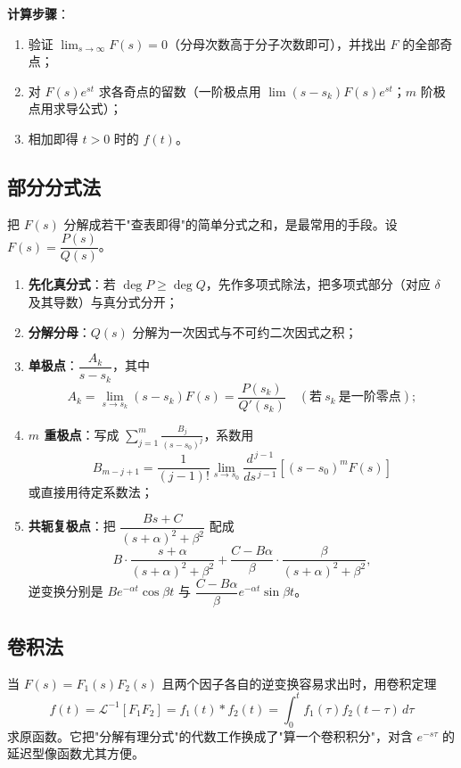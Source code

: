 \textbf{计算步骤}：
\begin{enumerate}
    \item 验证 \(\lim_{s\to\infty}F(s)=0\)（分母次数高于分子次数即可），并找出 \(F\) 的全部奇点；
    \item 对 \(F(s)e^{st}\) 求各奇点的留数（一阶极点用 \(\lim(s-s_k)F(s)e^{st}\)；\(m\) 阶极点用求导公式）；
    \item 相加即得 \(t>0\) 时的 \(f(t)\)。
\end{enumerate}

\subsection{部分分式法}

把 \(F(s)\) 分解成若干"查表即得"的简单分式之和，是最常用的手段。设 \(F(s)=\dfrac{P(s)}{Q(s)}\)。

\begin{enumerate}
    \item \textbf{先化真分式}：若 \(\deg P\ge\deg Q\)，先作多项式除法，把多项式部分（对应 \(\delta\) 及其导数）与真分式分开；
    \item \textbf{分解分母}：\(Q(s)\) 分解为一次因式与不可约二次因式之积；
    \item \textbf{单极点}：\(\dfrac{A_k}{s-s_k}\)，其中
    \[
    A_k=\lim_{s\to s_k}(s-s_k)F(s)=\frac{P(s_k)}{Q'(s_k)}\quad(\text{若}\ s_k\ \text{是一阶零点});
    \]
    \item \textbf{\(m\) 重极点}：写成 \(\displaystyle\sum_{j=1}^{m}\frac{B_j}{(s-s_0)^j}\)，系数用
    \[
    B_{m-j+1}=\frac{1}{(j-1)!}\lim_{s\to s_0}\frac{d^{\,j-1}}{ds^{\,j-1}}\left[(s-s_0)^mF(s)\right]
    \]
    或直接用待定系数法；
    \item \textbf{共轭复极点}：把 \(\dfrac{Bs+C}{(s+\alpha)^2+\beta^2}\) 配成
    \[
    B\cdot\frac{s+\alpha}{(s+\alpha)^2+\beta^2}+\frac{C-B\alpha}{\beta}\cdot\frac{\beta}{(s+\alpha)^2+\beta^2},
    \]
    逆变换分别是 \(Be^{-\alpha t}\cos\beta t\) 与 \(\dfrac{C-B\alpha}{\beta}e^{-\alpha t}\sin\beta t\)。
\end{enumerate}

\subsection{卷积法}

当 \(F(s)=F_1(s)F_2(s)\) 且两个因子各自的逆变换容易求出时，用卷积定理
\[
f(t)=\mathscr{L}^{-1}[F_1F_2]=f_1(t)*f_2(t)=\int_0^tf_1(\tau)f_2(t-\tau)\,d\tau
\]
求原函数。它把"分解有理分式"的代数工作换成了"算一个卷积积分"，对含 \(e^{-s\tau}\) 的延迟型像函数尤其方便。

